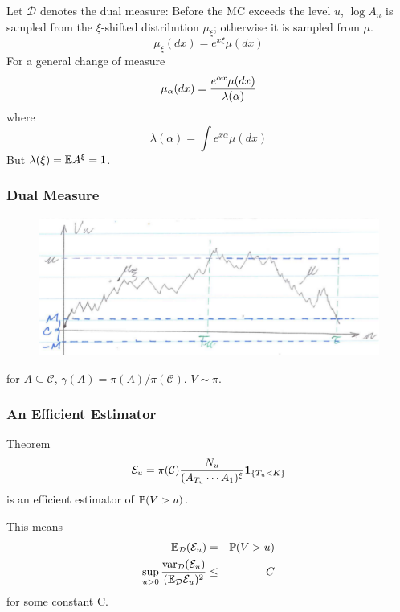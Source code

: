 \documentclass{beamer}
\begin{document}
\begin{frame}
  Let $\mathcal D$ denotes the dual measure:
  Before the MC exceeds the level $u$, $\log A_{n}$ is sampled from the
  $\xi$-shifted distribution $\mu_\xi$; otherwise it is sampled from
  $\mu$.
  \[
  \mu_\xi(dx) = e^{x \xi}\mu(dx)
  \]
  For a general change of measure
  \[
  \mu_\alpha(dx) = {
    e^{\alpha x}\mu(dx)
    \over
    \lambda(\alpha)
  }
  \]
  where
  \[
  \lambda(\alpha) = \int e^{x \alpha} \mu(dx)
  \]
  But $\lambda(\xi) = \E A^\xi = 1$.
\end{frame}

\begin{frame}
  \frametitle{Dual Measure}
  \begin{figure}[htb!]
    \centering
    \includegraphics[scale=0.6]{pic1.pdf}
  \end{figure}
  for $A \subseteq \mathcal C$, $\gamma(A) = \pi(A)/\pi(\mathcal
  C)$. $V \sim \pi$.
\end{frame}

\begin{frame}
  \frametitle{An Efficient Estimator}
  \begin{block}{Theorem}
    \[
    \mathcal E_u = \pi(\mathcal C) {N_u
      \over
      (A_{T_u} \cdots A_1)^\xi
    }\1{T_u < K}
    \]
    is an efficient estimator of $\P(V > u)$.
  \end{block}
  This means
  \begin{eqnarray*}
    \E_{\mathcal D}(\mathcal E_u) &=& \P(V > u) \\
    \sup_{u > 0} {
      \var_{\mathcal D}(\mathcal E_u)
      \over
      (\E_{\mathcal D} \mathcal E_u)^2
    } &\leq& C
  \end{eqnarray*}
  for some constant C.
\end{frame}
\end{document}
